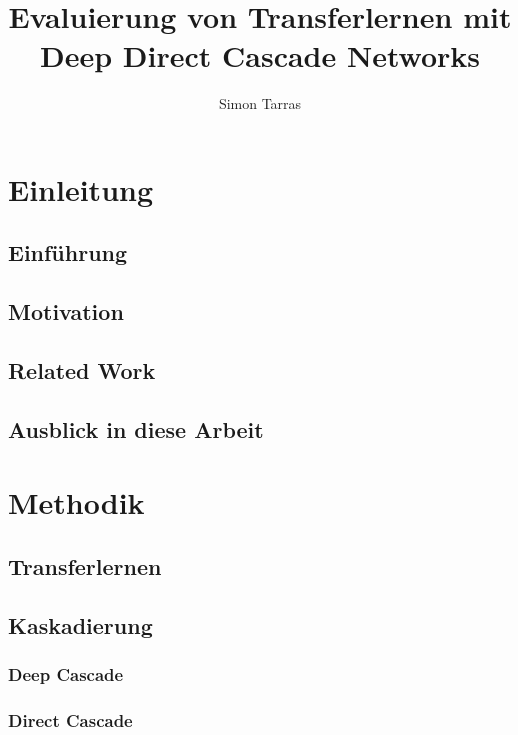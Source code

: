 \documentclass[ngerman]{report}
\title{Evaluierung von Transferlernen mit Deep Direct Cascade Networks}
\author{Simon Tarras}
\begin{document}
    \maketitle
    \tableofcontents

    \chapter{Einleitung}  %
    \section{Einführung}
    
    \section{Motivation}
    
    \section{Related Work}
    
    
    \section{Ausblick in diese Arbeit}
    

    \chapter{Methodik}  %
    
    \section{Transferlernen}  %
    
    \section{Kaskadierung}
    
    \subsection{Deep Cascade}
    
    \subsection{Direct Cascade}
    
\end{document}
